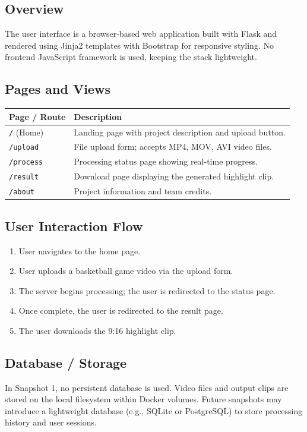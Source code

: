 \documentclass[12pt]{article}
\begin{document}
\subsection{Overview}
The user interface is a browser-based web application built with Flask and
rendered using Jinja2 templates with Bootstrap for responsive styling.
No frontend JavaScript framework is used, keeping the stack lightweight.

\subsection{Pages and Views}

\begin{tabularx}{\textwidth}{|l|X|}
    \hline
    \textbf{Page / Route} & \textbf{Description} \\
    \hline
    \texttt{/} (Home)     & Landing page with project description and upload button. \\
    \hline
    \texttt{/upload}      & File upload form; accepts MP4, MOV, AVI video files. \\
    \hline
    \texttt{/process}     & Processing status page showing real-time progress. \\
    \hline
    \texttt{/result}      & Download page displaying the generated highlight clip. \\
    \hline
    \texttt{/about}       & Project information and team credits. \\
    \hline
\end{tabularx}

\subsection{User Interaction Flow}
\begin{enumerate}[noitemsep]
    \item User navigates to the home page.
    \item User uploads a basketball game video via the upload form.
    \item The server begins processing; the user is redirected to the status page.
    \item Once complete, the user is redirected to the result page.
    \item The user downloads the 9:16 highlight clip.
\end{enumerate}

\subsection{Database / Storage}
In Snapshot 1, no persistent database is used. Video files and output clips are
stored on the local filesystem within Docker volumes. Future snapshots may
introduce a lightweight database (e.g., SQLite or PostgreSQL) to store processing
history and user sessions.
\end{document}
